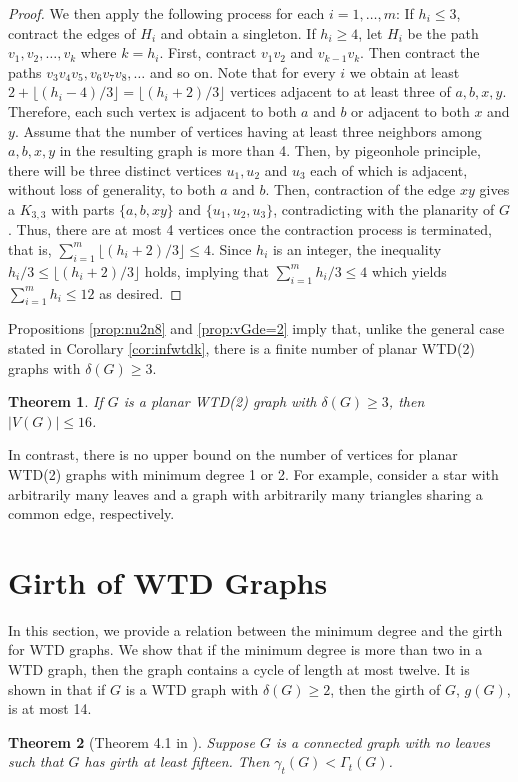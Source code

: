 \documentclass[11pt]{article}
\newtheorem{theorem}{Theorem}[section]
\theoremstyle{definition}
\begin{document}
\begin{proof}
We then apply the following process for each $i=1,\dots,m$:
If $h_i\leq 3$, contract the edges of $H_i$ and obtain a singleton.
If $h_i\geq 4$, let $H_i$ be the path $v_1,v_2,\dots,v_k$ where $k=h_i$.
First, contract $v_1v_2$ and $v_{k-1}v_k$.
Then contract the paths $v_3v_4v_5, v_6v_7v_8,\dots$ and so on.
Note that for every $i$ we obtain at least $2+\lfloor (h_i-4)/3\rfloor=\lfloor (h_i+2)/3\rfloor$ vertices adjacent to at least three of $a,b,x,y$.
Therefore, each such vertex is adjacent to both $a$ and $b$ or adjacent to both $x$ and $y$.
Assume that the number of vertices having at least three neighbors among $a,b,x,y$ in the resulting graph is more than 4.
Then, by pigeonhole principle, there will be three distinct vertices $u_1,u_2$ and $u_3$ each of which is adjacent, without loss of generality, to both $a$ and $b$. 
Then, contraction of the edge $xy$ gives a $K_{3,3}$ with parts $\{a,b,xy\}$ and $\{u_1,u_2,u_3\}$, contradicting with the planarity of $G$.
Thus, there are at most 4 vertices once the contraction process is terminated, that is, $\sum_{i=1}^m \lfloor (h_i+2)/3\rfloor \leq 4$.
Since $h_i$ is an integer, the inequality $h_i/3 \leq \lfloor (h_i+2)/3\rfloor$ holds, implying that $\sum_{i=1}^m h_i/3  \leq 4$ which yields $\sum_{i=1}^m h_i\leq 12$ as desired.
\end{proof} 

Propositions \ref{prop:nu2n8} and \ref{prop:vGde=2} imply that, unlike the general case stated in Corollary \ref{cor:infwtdk}, there is a finite number of planar WTD(2) graphs with $\delta(G)\geq 3$.

\begin{theorem}\label{thm:planar}
If $G$ is a planar WTD(2) graph with $\delta(G) \geq 3$, then $|V(G)|\leq 16$.
\end{theorem}

In contrast, there is no upper bound on the number of vertices for planar WTD(2) graphs with minimum degree 1 or 2.
For example, consider a star with arbitrarily many leaves and a graph with arbitrarily many triangles sharing a common edge, respectively.


\section{Girth of WTD Graphs} \label{sec:girthWTD}
In this section, we provide a relation between the minimum degree and the girth for WTD graphs.
We show that if the minimum degree is more than two in a WTD graph, then the graph contains a cycle of length at most twelve.
It is shown in \cite{HaRa97} that if $G$ is a WTD graph with $\delta(G)\geq 2$,
then the girth of $G$, $g(G)$, is at most 14.
\begin{theorem}[Theorem 4.1 in \cite{HaRa97}]
Suppose $G$ is a connected graph with no leaves such that $G$ has girth at least fifteen.
Then $\gamma_t(G)<\Gamma_t(G)$.
\end{theorem}
\end{document}
